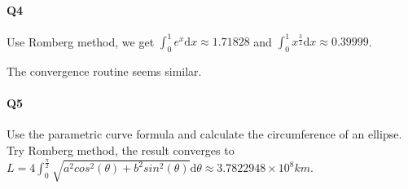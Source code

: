 \documentclass[11pt]{article}
\begin{document}
\paragraph{Q4}
Use Romberg method, we get $\int_{0}^{1}e^x \mathrm{d}x\approx1.71828$ and $\int_{0}^{1}x^{\frac{3}{2}}\mathrm{d}x\approx0.39999$.
\begin{figure}[H]
	\centering
\end{figure}
The convergence routine seems similar.
\paragraph{Q5}
Use the parametric curve formula and calculate the circumference of an ellipse. Try Romberg method, the result converges to $L=4\int_{0}^{\frac{\pi}{2}}\sqrt{a^2cos^2(\theta)+b^2sin^2(\theta)}\mathrm{d}\theta\approx3.7822948\times10^8km$.
\end{document}
